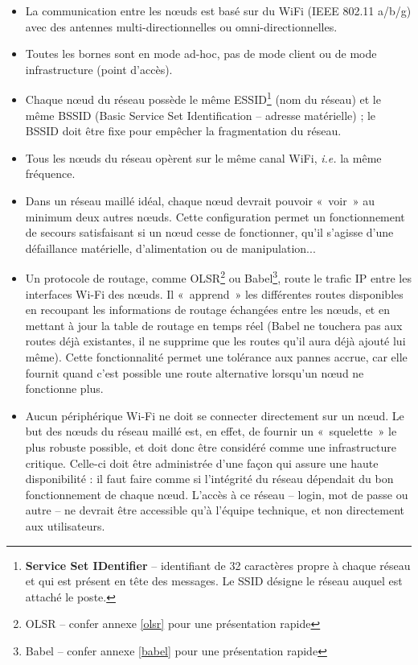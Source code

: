 \documentclass[a4paper,french,11pt,twoside]{article}
\begin{document}
\begin{itemize}
\renewcommand{\labelitemi}{$\bullet$}
     \item{La communication entre les nœuds est basé sur du WiFi (IEEE 802.11 a/b/g) avec des antennes multi-directionnelles ou omni-directionnelles.}
    \item{Toutes les bornes sont en mode ad-hoc, pas de mode client ou de mode infrastructure (point d'accès).}
     \item{Chaque nœud du réseau possède le même ESSID\footnote{\textbf{Service Set IDentifier} -- identifiant de 32 caractères propre à chaque réseau et qui est présent en tête des messages. Le SSID désigne le réseau auquel est attaché le poste.} (nom du réseau) et le même BSSID (Basic Service Set Identification -- adresse matérielle) ; le BSSID doit être fixe pour empêcher la fragmentation du réseau.}
    \item{Tous les nœuds du réseau opèrent sur le même canal WiFi, \textit{i.e.} la même fréquence.}
     \item{Dans un réseau maillé idéal, chaque nœud devrait pouvoir «~voir~» au minimum deux autres nœuds. Cette configuration permet un fonctionnement de secours satisfaisant si un nœud cesse de fonctionner, qu'il s'agisse d'une défaillance matérielle, d'alimentation ou de manipulation...}
     \item{Un protocole de routage, comme OLSR\footnote{OLSR -- confer annexe \ref{olsr} pour une présentation rapide} ou Babel\footnote{Babel -- confer annexe \ref{babel} pour une présentation rapide}, route le trafic IP entre les interfaces Wi-Fi des nœuds. Il «~apprend~» les différentes routes disponibles en recoupant les informations de routage échangées entre les nœuds, et en mettant à jour la table de routage en temps réel (Babel ne touchera pas aux routes déjà existantes, il ne supprime que les routes qu'il aura déjà ajouté lui même). Cette fonctionnalité permet une tolérance aux pannes accrue, car elle fournit quand c'est possible une route alternative lorsqu'un nœud ne fonctionne plus.}
     \item{Aucun périphérique Wi-Fi ne doit se connecter directement sur un nœud. Le but des nœuds du réseau maillé est, en effet, de fournir un «~squelette~» le plus robuste possible, et doit donc être considéré comme une infrastructure critique. Celle-ci doit être administrée d'une façon qui assure une haute disponibilité : il faut faire comme si l'intégrité du réseau dépendait du bon fonctionnement de chaque nœud. L'accès à ce réseau -- login, mot de passe ou autre -- ne devrait être accessible qu'à l'équipe technique, et non directement aux utilisateurs.}

\end{itemize}
\end{document}
